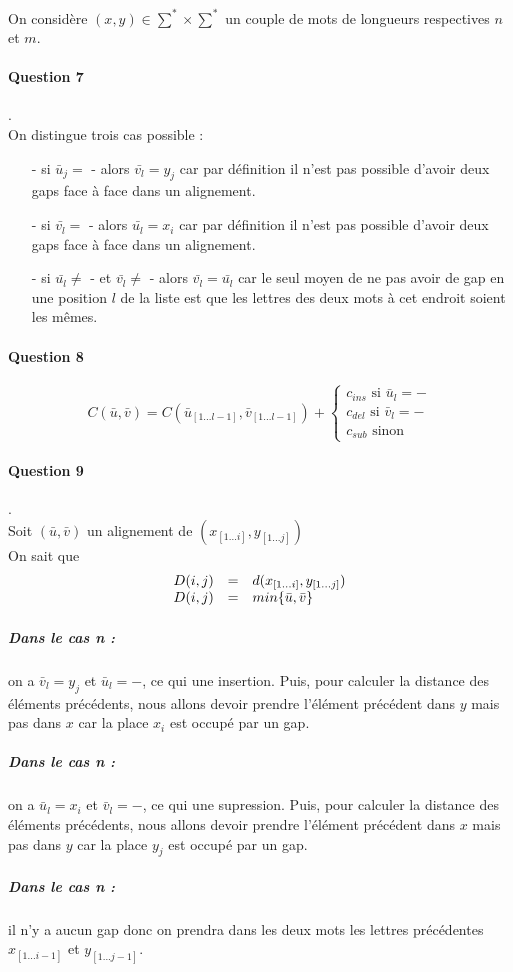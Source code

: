 On considère $(x,y)\in \sum^* \times \sum^*$ un couple de mots de longueurs respectives $n$ et $m$.
\paragraph{Question 7}.\\
On distingue trois cas possible :\begin{itemize}
\item[-] si $\bar{u}_j =$ - alors $\bar{v_l} = y_j$ car par définition il n'est pas possible d'avoir deux gaps face à face dans un alignement.
\item[-] si $\bar{v_l} =$ - alors $\bar{u_l} = x_i$ car par définition il n'est pas possible d'avoir deux gaps face à face dans un alignement.
\item[-] si $\bar{u_l} \neq$ - et $\bar{v_l} \neq$ - alors $\bar{v_l} = \bar{u_l}$ car le seul moyen de ne pas avoir de gap en une position $l$ de la liste est que les lettres des deux mots à cet endroit soient les mêmes.
\end{itemize}
\paragraph{Question 8}
$$C(\bar u, \bar v) = C(\bar u_{[1...l-1]}, \bar v_{[1...l-1]}) + \left \{
    \begin{array}{rcl}
        c_{ins} \text{ si } \bar u_l = -\\
        c_{del} \text{ si } \bar v_l = -\\
        c_{sub} \text{ sinon }
    \end{array}
\right.$$
\paragraph{Question 9}.\\
Soit $(\bar u, \bar v)$ un alignement de $(x_{[1...i]} ,y_{[1...j]})$\\
On sait que
$$
 \begin{array}{r c l}
      D(i,j) & = & d(x_{[1...i]} ,y_{[1...j]}) \\
      D(i,j) & = & min\{\bar u, \bar v\}\\
   \end{array}
$$
\subparagraph*{Dans le cas n :}on a $\bar v_l = y_j$ et $\bar u_l = -$, ce qui une insertion. Puis, pour calculer la distance des éléments précédents, nous allons devoir prendre l'élément précédent dans $y$ mais pas dans $x$ car la place $x_i$ est occupé par un gap.
\subparagraph*{Dans le cas n :}on a $\bar u_l = x_i$ et $\bar v_l = -$, ce qui une supression. Puis, pour calculer la distance des éléments précédents, nous allons devoir prendre l'élément précédent dans $x$ mais pas dans $y$ car la place $y_j$ est occupé par un gap.
\subparagraph*{Dans le cas n :}il n'y a aucun gap donc on prendra dans les deux mots les lettres précédentes $x_{[1...i-1]}$ et $y_{[1...j-1]}$.

